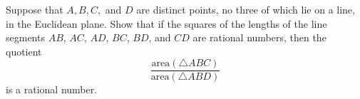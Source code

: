 Suppose that $A,B,C,$ and $D$ are distinct points, no three of which lie on a line,
in the Euclidean plane. Show
that if the squares of the lengths of the line segments $AB$, $AC$, $AD$, $BC$, $BD$, and $CD$
are rational numbers, then
the quotient
\[
\frac{\mathrm{area}(\triangle ABC)}{\mathrm{area}(\triangle ABD)}
\]
is a rational number.
